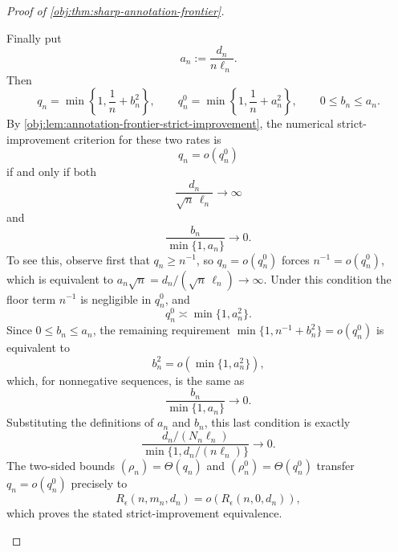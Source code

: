 \begin{proof}[Proof of \cref{obj:thm:sharp-annotation-frontier}]
\begin{enumerate}
Finally put
\[
a_n:=\frac{d_n}{n\ell_n}.
\]
Then
\[
q_n=\min\left\{1,\frac1n+b_n^2\right\},
\qquad
q_n^{0}=\min\left\{1,\frac1n+a_n^2\right\},
\qquad
0\le b_n\le a_n .
\]
By \cref{obj:lem:annotation-frontier-strict-improvement}, the numerical strict-improvement
criterion for these two rates is
\[
q_n=o(q_n^{0})
\]
if and only if both
\[
\frac{d_n}{\sqrt n\,\ell_n}\to\infty
\]
and
\[
\frac{b_n}{\min\{1,a_n\}}\to0.
\]
To see this, observe first that \(q_n\ge n^{-1}\), so \(q_n=o(q_n^{0})\) forces
\(n^{-1}=o(q_n^{0})\), which is equivalent to
\(a_n\sqrt n=d_n/(\sqrt n\,\ell_n)\to\infty\).  Under this condition the floor term \(n^{-1}\) is negligible in \(q_n^{0}\), and
\[
q_n^{0}\asymp \min\{1,a_n^2\}.
\]
Since \(0\le b_n\le a_n\), the remaining requirement
\(\min\{1,n^{-1}+b_n^2\}=o(q_n^{0})\) is equivalent to
\[
b_n^2=o(\min\{1,a_n^2\}),
\]
which, for nonnegative sequences, is the same as
\[
\frac{b_n}{\min\{1,a_n\}}\to0.
\]
Substituting the definitions of \(a_n\) and \(b_n\), this last condition is exactly
\[
\frac{d_n/(N_n\ell_n)}
{\min\{1,d_n/(n\ell_n)\}}
\to0.
\]
The two-sided bounds \((\rho_n)=\Theta(q_n)\) and \((\rho_n^{0})=\Theta(q_n^{0})\) transfer
\(q_n=o(q_n^{0})\) precisely to
\[
R_\epsilon(n,m_n,d_n)
=
o\!\left(R_\epsilon(n,0,d_n)\right),
\]
which proves the stated strict-improvement equivalence. %
\end{enumerate}
\end{proof}

